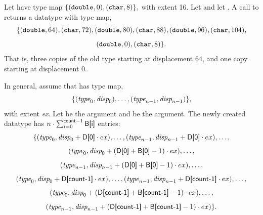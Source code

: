 \begin{example}
\label{pt2pt-exU}
%
%
Let  have type map
\(
\{ (\ctype{double}, 0), (\ctype{char}, 8) \} ,
\)
with extent 16.
Let   and let .  A call to
 returns a datatype with
type map,
\begin{displaymath}
\{
(\ctype{double}, 64), (\ctype{char}, 72), (\ctype{double}, 80), (\ctype{char},
88), (\ctype{double}, 96), (\ctype{char}, 104),
\end{displaymath}
\begin{displaymath}
(\ctype{double}, 0), (\ctype{char}, 8)
\} .
\end{displaymath}
That is, three copies of the old type starting at displacement
64, and one copy starting at displacement 0.
\end{example}

In general,
assume that  has type map,
\begin{displaymath}
\{ (\textrm{\itshape{type}}_0,\textrm{\itshape{disp}}_0), \ldots, (\textrm{\itshape{type}}_{n-1}, \textrm{\itshape{disp}}_{n-1}) \} ,
\end{displaymath}
with extent \emph{ex}.
Let  be the  argument and
 be the\flushline
{} argument. The newly created datatype
has $n \cdot \sum_{i=0}^{\mscode{count}-1}
\mpiarg{B[i]}$ entries:
\begin{displaymath}
\{
(\mword{type}_0, \mword{disp}_0 + \mpiarg{D[0]} \cdot ex ) , \ldots ,
(\mword{type}_{n-1} , \mword{disp}_{n-1} + \mpiarg{D[0]} \cdot ex ) , \ldots ,
\end{displaymath}
\begin{displaymath}
(\mword{type}_0 , \mword{disp}_0 + (\mpiarg{D[0]} + \mpiarg{B[0]} -1) \cdot ex) ,\ldots,
\end{displaymath}
\begin{displaymath}
(\mword{type}_{n-1} , \mword{disp}_{n-1} + (\mpiarg{D[0]} +\mpiarg{B[0]} -1) \cdot ex ) ,
\ldots,
\end{displaymath}
\begin{displaymath}
(\mword{type}_0, \mword{disp}_0 + \mpiarg{D[count-1]} \cdot ex ) , \ldots ,
(\mword{type}_{n-1} , \mword{disp}_{n-1} + \mpiarg{D[count-1]} \cdot ex ) , \ldots ,
\end{displaymath}
\begin{displaymath}
(\mword{type}_0 , \mword{disp}_0 + (\mpiarg{D[count-1]} + \mpiarg{B[count-1]} -1) \cdot ex)
,\ldots,
\end{displaymath}
\begin{displaymath}
(\mword{type}_{n-1} , \mword{disp}_{n-1} + (\mpiarg{D[count-1]} +\mpiarg{B[count-1]} -1)
\cdot ex )
\} .
\end{displaymath}

